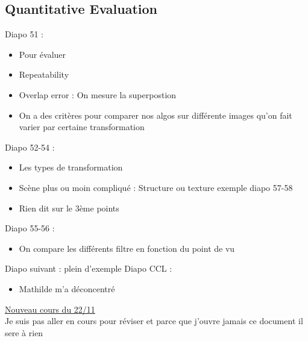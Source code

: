 \documentclass{article}
\theoremstyle{plain}%
\theoremstyle{definition}
\theoremstyle{remark}
\begin{document}
\subsection{Quantitative Evaluation}
Diapo 51 : 
\begin{itemize}
    \item Pour évaluer 
    \item Repeatability 
    \item Overlap error : On mesure la superpostion 
    \item On a des critères pour comparer nos algos sur différente images qu'on fait varier par certaine transformation
\end{itemize}
Diapo 52-54 : 
\begin{itemize}
    \item Les types de transformation 
    \item Scène plus ou moin compliqué : Structure ou texture exemple diapo 57-58
    \item Rien dit sur le 3ème points
\end{itemize}
Diapo 55-56 :
\begin{itemize}
    \item On compare les différents filtre en fonction du point de vu
\end{itemize}
Diapo suivant : plein d'exemple 
Diapo CCL : 
\begin{itemize}
    \item Mathilde m'a déconcentré 
\end{itemize}


\underline{Nouveau cours du 22/11} \\
Je suis pas aller en cours pour réviser et parce que j'ouvre jamais ce document il sere à rien
\end{document}

